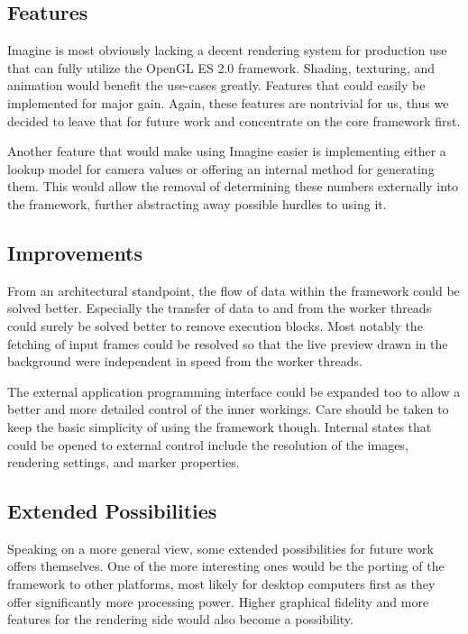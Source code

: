 \subsection{Features}

Imagine is most obviously lacking a decent rendering system for production use that can fully utilize the OpenGL ES 2.0 framework.
Shading, texturing, and animation would benefit the use-cases greatly.
Features that could easily be implemented for major gain.
Again, these features are nontrivial for us, thus we decided to leave that for future work and concentrate on the core framework first.

Another feature that would make using Imagine easier is implementing either a lookup model for camera values or offering an internal method for generating them.
This would allow the removal of determining these numbers externally into the framework, further abstracting away possible hurdles to using it.

\subsection{Improvements}

From an architectural standpoint, the flow of data within the framework could be solved better.
Especially the transfer of data to and from the worker threads could surely be solved better to remove execution blocks.
Most notably the fetching of input frames could be resolved so that the live preview drawn in the background were independent in speed from the worker threads.

The external application programming interface could be expanded too to allow a better and more detailed control of the inner workings.
Care should be taken to keep the basic simplicity of using the framework though.
Internal states that could be opened to external control include the resolution of the images, rendering settings, and marker properties.

\subsection{Extended Possibilities}

Speaking on a more general view, some extended possibilities for future work offers themselves.
One of the more interesting ones would be the porting of the framework to other platforms, most likely for desktop computers first as they offer significantly more processing power.
Higher graphical fidelity and more features for the rendering side would also become a possibility.

